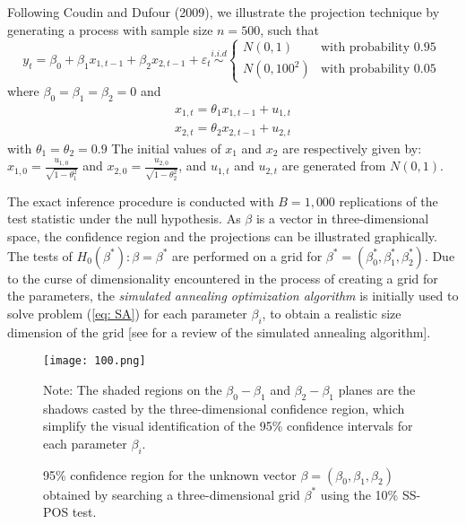 \documentclass[harvard,11pt]{article}
\begin{document}
Following Coudin and Dufour (2009), we illustrate the projection technique by generating a process with sample size $n=500$, such that
\begin{equation*}
y_t=\beta_0+\beta_1x_{1,t-1}+\beta_2x_{2,t-1}+\varepsilon_t\overset{i.i.d}{\sim}\left\{ 
\begin{array}{cc}
N(0,1) & \text{with probability 0.95}  \\ 
N(0,100^2) & \text{with probability 0.05} %
\end{array}%
\right. \,
\end{equation*}
where $\beta_0=\beta_1=\beta_2=0$ and
\begin{eqnarray*}
x_{1,t}=\theta_1x_{1,t-1}+u_{1,t}\\
x_{2,t}=\theta_2x_{2,t-1}+u_{2,t}
\end{eqnarray*}
with $\theta_1=\theta_2=0.9$ 
 The initial values of $x_1$ and $x_2$ are respectively given by: $x_{1,0}=\frac{u_{1,0}}{\sqrt{1-\theta_1^2}}$ and  $x_{2,0}=\frac{u_{2,0}}{\sqrt{1-\theta_2^2}}$, and $u_{1,t}$ and $u_{2,t}$ are generated from $N(0,1)$. 

The exact inference procedure is conducted with $B=1,000$ replications of the test statistic under the null hypothesis. As $\beta$ is a vector in three-dimensional space, the confidence region and the projections can be illustrated graphically. The tests of $H_0(\beta^*):\beta=\beta^*$ are performed on a grid for $\beta^*=(\beta_0^*,\beta_1^*,\beta_2^*)$. Due to the curse of dimensionality encountered in the process of creating a grid for the parameters, the \textit{simulated annealing optimization algorithm} is initially used to solve problem (\ref{eq: SA}) for each parameter $\beta_i$, to obtain a realistic size dimension of the grid [see \citet{goffe1994global} for a review of the simulated annealing algorithm].

\begin{figure}[tbph]
\caption{95\% confidence region for the unknown vector $\beta=(\beta_0,\beta_1,\beta_2)$ obtained by searching a three-dimensional grid $\beta^*$ using the 10\% SS-POS test.}
\begin{center}
\texttt{[image: 100.png]} %
\end{center}

Note: The shaded regions on the $\beta_0-\beta_1$ and $\beta_2-\beta_1$ planes are the shadows casted by the three-dimensional confidence region, which simplify the visual identification of the 95\% confidence intervals for each parameter $\beta_i$.
\label{fig: Confidence Region}
\end{figure}
\end{document}
